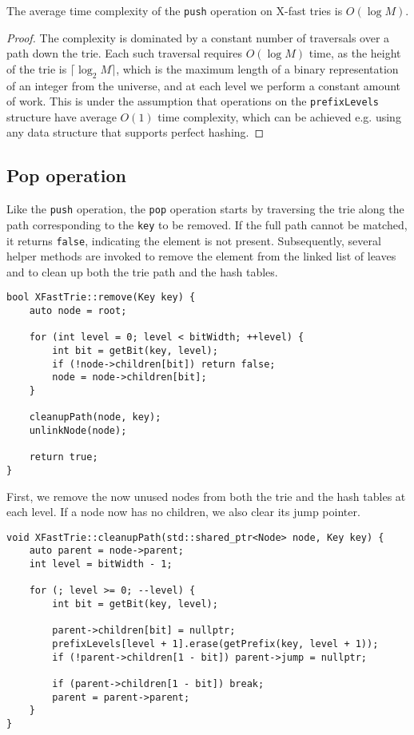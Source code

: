 \begin{lemma}
The average time complexity of the \texttt{push} operation on X-fast tries is \( O(\log M) \).
\end{lemma}

\begin{proof}
The complexity is dominated by a constant number of traversals over a path down the trie. Each such traversal requires \( O(\log M) \) time, as the height of the trie is \( \lceil \log_2 M \rceil \), which is the maximum length of a binary representation of an integer from the universe, and at each level we perform a constant amount of work. This is under the assumption that operations on the \texttt{prefixLevels} structure have average \( O(1) \) time complexity, which can be achieved e.g. using any data structure that supports perfect hashing.
\end{proof}

\subsection{Pop operation}
Like the \texttt{push} operation, the \texttt{pop} operation starts by traversing the trie along the path corresponding to the \texttt{key} to be removed. If the full path cannot be matched, it returns \texttt{false}, indicating the element is not present. Subsequently, several helper methods are invoked to remove the element from the linked list of leaves and to clean up both the trie path and the hash tables.

\begin{verbatim}
bool XFastTrie::remove(Key key) {
    auto node = root;

    for (int level = 0; level < bitWidth; ++level) {
        int bit = getBit(key, level);
        if (!node->children[bit]) return false;
        node = node->children[bit];
    }

    cleanupPath(node, key);
    unlinkNode(node);

    return true;
}
\end{verbatim}

First, we remove the now unused nodes from both the trie and the hash tables at each level. If a node now has no children, we also clear its jump pointer.

\begin{verbatim}
void XFastTrie::cleanupPath(std::shared_ptr<Node> node, Key key) {
    auto parent = node->parent;
    int level = bitWidth - 1;

    for (; level >= 0; --level) {
        int bit = getBit(key, level);

        parent->children[bit] = nullptr;
        prefixLevels[level + 1].erase(getPrefix(key, level + 1));
        if (!parent->children[1 - bit]) parent->jump = nullptr;

        if (parent->children[1 - bit]) break;
        parent = parent->parent;
    }
}
\end{verbatim}


